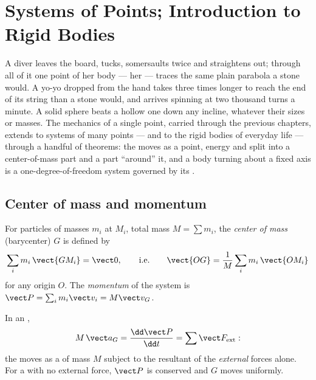 \chapter{Systems of Points; Introduction to Rigid Bodies}\label{ch:b1:systems-of-points}

A diver leaves the board, tucks, somersaults twice and straightens out;
through all of it one point of her body --- her  ---
traces the same plain parabola a stone would. A yo-yo dropped from the
hand takes three times longer to reach the end of its string than a
stone would, and arrives spinning at two thousand turns a minute. A
solid sphere beats a hollow one down any incline, whatever their sizes
or masses. The mechanics of a single point, carried through the previous
chapters, extends to systems of many points --- and to the rigid bodies
of everyday life --- through a handful of theorems: the 
moves as a point, energy and  split into a center-of-mass
part and a part ``around'' it, and a body turning about a fixed axis is
a one-degree-of-freedom system governed by its .

\section{Center of mass and momentum}

\begin{definition}\label{def:b1:systems-of-points:cm}
For particles of masses $m_i$ at $M_i$, total mass $M = \sum m_i$, the
\emph{center of mass} (barycenter) $G$ is defined by
\[
\sum_i m_i\,\vect{GM_i} = \vect 0, \qquad\text{i.e.}\qquad
\vect{OG} = \frac{1}{M}\sum_i m_i\,\vect{OM_i}
\]
for any origin $O$. The \emph{momentum} of the system is $\vect P =
\sum_i m_i\vect v_i = M\vect v_G$.
\end{definition}

\begin{theorem}\label{thm:b1:systems-of-points:cmtheorem}
In an ,
\[
M\,\vect a_G = \frac{\dd\vect P}{\dd t} = \sum\vect F_{\mathrm{ext}} :
\]
the  moves as a  of mass $M$ subject to the
resultant of the \emph{external} forces alone. For a  with
no external force, $\vect P$ is conserved and $G$ moves uniformly.
\end{theorem}

